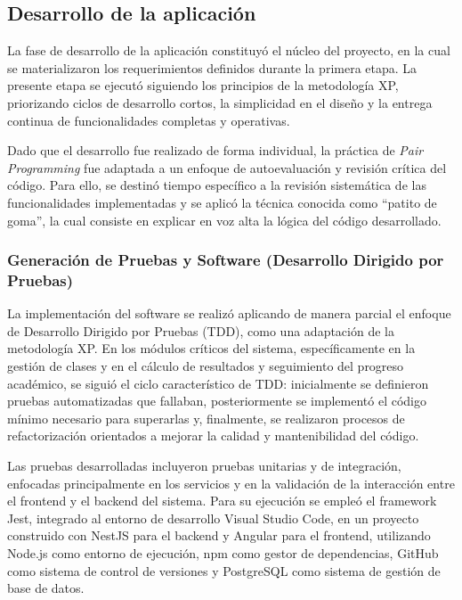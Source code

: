 \subsection{Desarrollo de la aplicación}

La fase de desarrollo de la aplicación constituyó el núcleo del proyecto, en la cual se materializaron los requerimientos definidos durante la primera etapa. La presente etapa se ejecutó siguiendo los principios de la metodología XP, priorizando ciclos de desarrollo cortos, la simplicidad en el diseño y la entrega continua de funcionalidades completas y operativas.

Dado que el desarrollo fue realizado de forma individual, la práctica de \textit{Pair Programming} fue adaptada a un enfoque de autoevaluación y revisión crítica del código. Para ello, se destinó tiempo específico a la revisión sistemática de las funcionalidades implementadas y se aplicó la técnica conocida como ``patito de goma'', la cual consiste en explicar en voz alta la lógica del código desarrollado.

\subsubsection*{Generación de Pruebas y Software (Desarrollo Dirigido por Pruebas)}

La implementación del software se realizó aplicando de manera parcial el enfoque de Desarrollo Dirigido por Pruebas (TDD), como una adaptación de la metodología XP. En los módulos críticos del sistema, específicamente en la gestión de clases y en el cálculo de resultados y seguimiento del progreso académico, se siguió el ciclo característico de TDD: inicialmente se definieron pruebas automatizadas que fallaban, posteriormente se implementó el código mínimo necesario para superarlas y, finalmente, se realizaron procesos de refactorización orientados a mejorar la calidad y mantenibilidad del código.

Las pruebas desarrolladas incluyeron pruebas unitarias y de integración, enfocadas principalmente en los servicios y en la validación de la interacción entre el frontend y el backend del sistema. Para su ejecución se empleó el framework Jest, integrado al entorno de desarrollo Visual Studio Code, en un proyecto construido con NestJS para el backend y Angular para el frontend, utilizando Node.js como entorno de ejecución, npm como gestor de dependencias, GitHub como sistema de control de versiones y PostgreSQL como sistema de gestión de base de datos.

